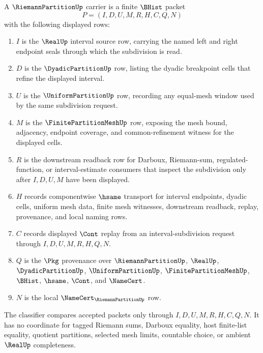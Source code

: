 \begin{definition}
\label{def:riemann-partition-carrier}
A $\RiemannPartitionUp$ carrier is a finite $\BHist$ packet
$$
P=(I,D,U,M,R,H,C,Q,N)
$$
with the following displayed rows:
\begin{enumerate}
\item $I$ is the $\RealUp$ interval source row, carrying the named left and right endpoint seals through which the subdivision is read.
\item $D$ is the $\DyadicPartitionUp$ row, listing the dyadic breakpoint cells that refine the displayed interval.
\item $U$ is the $\UniformPartitionUp$ row, recording any equal-mesh window used by the same subdivision request.
\item $M$ is the $\FinitePartitionMeshUp$ row, exposing the mesh bound, adjacency, endpoint coverage, and common-refinement witness for the displayed cells.
\item $R$ is the downstream readback row for Darboux, Riemann-sum, regulated-function, or interval-estimate consumers that inspect the subdivision only after $I,D,U,M$ have been displayed.
\item $H$ records componentwise $\hsame$ transport for interval endpoints, dyadic cells, uniform mesh data, finite mesh witnesses, downstream readback, replay, provenance, and local naming rows.
\item $C$ records displayed $\Cont$ replay from an interval-subdivision request through $I,D,U,M,R,H,Q,N$.
\item $Q$ is the $\Pkg$ provenance over $\RiemannPartitionUp$, $\RealUp$, $\DyadicPartitionUp$, $\UniformPartitionUp$, $\FinitePartitionMeshUp$, $\BHist$, $\hsame$, $\Cont$, and $\NameCert$.
\item $N$ is the local $\NameCert_{\RiemannPartitionUp}$ row.
\end{enumerate}
The classifier compares accepted packets only through $I,D,U,M,R,H,C,Q,N$. It has no coordinate for tagged Riemann sums, Darboux equality, host finite-list equality, quotient partitions, selected mesh limits, countable choice, or ambient $\RealUp$ completeness.
\end{definition}

